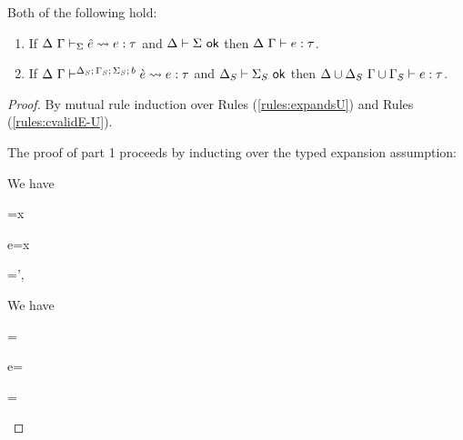 \begin{theorem}\label{thm:typed-expansion-U} Both of the following hold:
\begin{enumerate}
\item If $\Delta~\Gamma \vdash_{\Sigma} {\hat e} \leadsto e : \tau$ and $\Delta \vdash \Sigma~\mathsf{ok}$ then $\Delta~\Gamma \vdash e : \tau$.
\item If $\Delta~\Gamma\vdash^{\Delta_S;\,\Gamma_S;\,\Sigma_S;\,b} \grave{e} \leadsto e : \tau$ and $\Delta_S \vdash \Sigma_S~\mathsf{ok}$ then ${\Delta}\cup{\Delta_S}~{\Gamma}\cup{\Gamma_S} \vdash e : \tau$.
\end{enumerate}
\end{theorem}
\begin{proof}
By mutual rule induction over Rules (\ref{rules:expandsU}) and Rules (\ref{rules:cvalidE-U}). 

The proof of part 1 proceeds by inducting over the typed expansion assumption:
\begin{byCases}
\item[\text{(\ref{rule:expandsU-var})}] We have
\begin{pfsteps}
  \item \ue=x 
  \item e=x 
  \item \Gamma=\Gamma',  
  \item {} 
\end{pfsteps}
\resetpfcounter

\item[\text{(\ref{rule:expandsU-lam})}] We have 
\begin{pfsteps}
  \item \ue= 
  \item e= 
  \item \tau= 
  \item {}  
  \item {}  
  \item \uetsmenv{\Delta}{\Sigma}  
  \item {}  
  \item {} 
\end{pfsteps}
\resetpfcounter


\end{byCases}
\end{proof}
